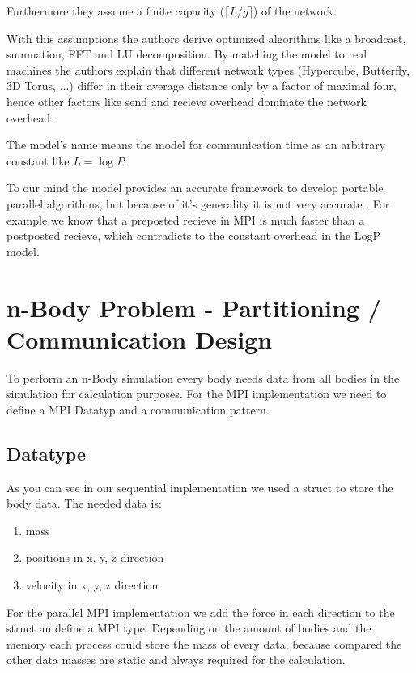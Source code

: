 \documentclass[oneside, a4paper, DIV=10]{scrartcl}
\begin{document}
\begin{itemize}
    Furthermore they assume a finite capacity ($\lceil L/g \rceil$) of the
    network.

    With this assumptions the authors derive optimized algorithms like a
    broadcast, summation, FFT and LU decomposition. By matching the
    model to real machines the authors explain that different network
    types (Hypercube, Butterfly, 3D Torus, ...) differ in their average
    distance only by a factor of maximal four, hence other factors like
    send and recieve overhead dominate the network overhead.

    The model's name means the model for communication time as an arbitrary
    constant like $L = \log P$.

    To our mind the model provides an accurate framework to develop portable
    parallel algorithms, but because of it's generality it is not very accurate
    . For example we know that a preposted recieve in MPI is much faster
    than a postposted recieve, which contradicts to the constant overhead
    in the LogP model.
\end{itemize}
\section*{n-Body Problem - Partitioning / Communication Design}
	To perform an n-Body simulation every body needs data from all bodies in the
    simulation for calculation purposes. For the MPI implementation we need to 
    define a MPI Datatyp and a communication pattern.
    
    \subsection*{Datatype}
    As you can see in our sequential implementation we used a struct to store
    the body data. The needed data is:
    \begin{enumerate}
    	\item mass
        \item positions in x, y, z direction
        \item velocity in x, y, z direction
    \end{enumerate}
    For the parallel MPI implementation we add the force in each direction to
    the struct an define a MPI type.
    Depending on the amount of bodies and the memory each process could store
    the mass of every data, because compared the other data masses are static
    and always required for the calculation.
    
\end{document}
